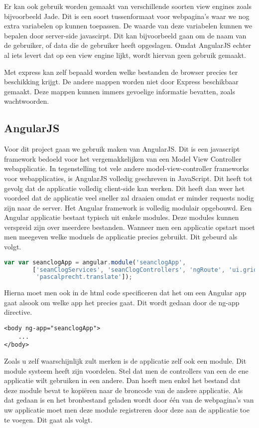 \documentclass[a4paper,11pt]{article}
\begin{document}
Er kan ook gebruik worden gemaakt van verschillende soorten view engines zoals bijvoorbeeld Jade. Dit is een soort tussenformaat voor webpagina's waar we nog extra variabelen op kunnen toepassen. De waarde van deze variabelen kunnen we bepalen door server-side javascirpt. Dit kan bijvoorbeeld gaan om de naam van de gebruiker, of data die de gebruiker heeft opgeslagen. Omdat AngularJS echter al iets levert dat op een view engine lijkt, wordt hiervan geen gebruik gemaakt.

Met express kan zelf bepaald worden welke bestanden de browser precies ter beschikking krijgt. De andere mappen worden niet door Express beschikbaar gemaakt. Deze mappen kunnen immers gevoelige informatie bevatten, zoals wachtwoorden.

\subsection{AngularJS}

Voor dit project gaan we gebruik maken van AngularJS. Dit is een javascript framework bedoeld voor het vergemakkelijken van een Model View Controller webapplicatie. In tegenstelling tot vele andere model-view-controller frameworks voor webapplicaties, is AngularJS volledig geschreven in JavaScript. Dit heeft tot gevolg dat de applicatie volledig client-side kan werken. Dit heeft dan weer het voordeel dat de applicatie veel sneller zal draaien omdat er minder requests nodig zijn naar de server. Het Angular framework is volledig modulair opgebouwd. Een Angular applicatie bestaat typisch uit enkele modules. Deze modules kunnen verspreid zijn over meerdere bestanden. Wanneer men een applicatie opstart moet men meegeven welke moduels de applicatie precies gebruikt. Dit gebeurd als volgt.

\begin{lstlisting}[language=javascript]
var var seanclogApp = angular.module('seanclogApp',
		['seanClogServices', 'seanClogControllers', 'ngRoute', 'ui.grid',
		 'pascalprecht.translate']);
\end{lstlisting}
Hierna moet men ook in de html code specificeren dat het om een Angular app gaat alsook om welke app het precies gaat. Dit wordt gedaan door de ng-app directive.
\begin{lstlisting}
<body ng-app="seanclogApp">
	...
</body>
\end{lstlisting}

Zoals u zelf waarschijnlijk zult merken is de applicatie zelf ook een module. Dit module systeem heeft zijn voordelen. Stel dat men de controllers van een de ene applicatie wilt gebruiken in een andere. Dan hoeft men enkel het bestand dat deze module bevat te kopiëren naar de broncode van de andere applicatie. Als dat gedaan is en het bronbestand geladen wordt door één van de webpagina's van uw applicatie moet men deze module registreren door deze aan de applicatie toe te voegen. Dit gaat als volgt.
\end{document}
